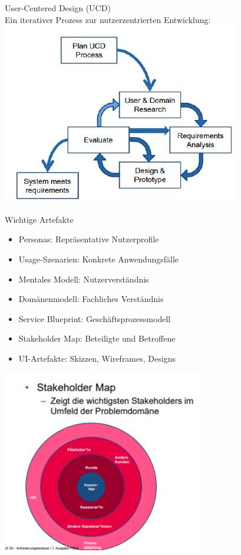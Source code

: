 \begin{concept}{User-Centered Design (UCD)}\\
Ein iterativer Prozess zur nutzerzentrierten Entwicklung:\\
\includegraphics[width=0.7\linewidth]{images/2024_12_29_0d1d7b5551ea1b4b41bdg-03}
\end{concept}
\begin{theorem}{Wichtige Artefakte}
\begin{itemize}
    \item Personas: Repräsentative Nutzerprofile
    \item Usage-Szenarien: Konkrete Anwendungsfälle
    \item Mentales Modell: Nutzerverständnis
    \item Domänenmodell: Fachliches Verständnis
    \item Service Blueprint: Geschäftsprozessmodell
    \item Stakeholder Map: Beteiligte und Betroffene
    \item UI-Artefakte: Skizzen, Wireframes, Designs
\end{itemize}
\includegraphics[width=0.5\linewidth]{images/2024_12_29_0d1d7b5551ea1b4b41bdg-04}
\end{theorem}

